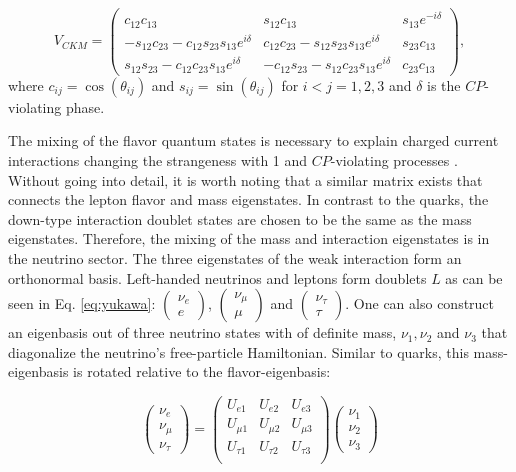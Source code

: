 \begin{equation}
V_{CKM} = \begin{pmatrix}
c_{12}c_{13} & s_{12}c_{13} & s_{13}e^{-i\delta} \\
-s_{12}c_{23} - c_{12}s_{23}s_{13} e^{i\delta} & c_{12}c_{23} - s_{12}s_{23}s_{13}e^{i\delta} & s_{23}c_{13} \\
s_{12}s_{23} - c_{12}c_{23}s_{13}e^{i\delta} 
& -c_{12}s_{23} - s_{12}c_{23}s_{13}e^{i\delta} & c_{23}c_{13}
\end{pmatrix},
\end{equation}
where $c_{ij} = \cos\left(\theta_{ij}\right)$ and  $s_{ij} = \sin\left(\theta_{ij}\right)$ for $i<j = 1,2,3$ and $\delta$ is the $CP$-violating phase.

The mixing of the flavor quantum states is necessary to explain charged current interactions changing the strangeness with 1 \cite{Glashow:1970gm} and $CP$-violating processes \cite{1964PhRvL}.\\

\noindent Without going into detail, it is worth noting that a similar matrix exists that connects the lepton flavor and mass eigenstates. In contrast to the quarks, the down-type interaction doublet states are chosen to be the same as the mass eigenstates. Therefore, the mixing of the mass and interaction eigenstates is in the neutrino sector. The three eigenstates of the weak interaction form an orthonormal basis. Left-handed neutrinos and leptons form doublets $L$ as can be seen in Eq. \ref{eq:yukawa}: $\begin{pmatrix}\nu_e \\ e \end{pmatrix}$, $\begin{pmatrix}\nu_\mu \\ \mu \end{pmatrix}$ and $\begin{pmatrix}\nu_\tau \\ \tau \end{pmatrix}$. One can also construct an eigenbasis out of three neutrino states with of definite mass, $\nu_1, \nu_2$ and $\nu_3$ that diagonalize the neutrino's free-particle Hamiltonian. Similar to quarks, this mass-eigenbasis is rotated relative to the flavor-eigenbasis:

\begin{equation}
\begin{pmatrix}
\nu_e \\ \nu_\mu \\ \nu_\tau
\end{pmatrix}
=
\begin{pmatrix}
U_{e1} & U_{e2} & U_{e3} \\
U_{\mu 1} & U_{\mu 2} & U_{\mu 3} \\
U_{\tau 1} & U_{\tau 2} & U_{\tau 3} \\
\end{pmatrix}
\begin{pmatrix}
\nu_1 \\ \nu_2 \\ \nu_3
\end{pmatrix}
\end{equation}

